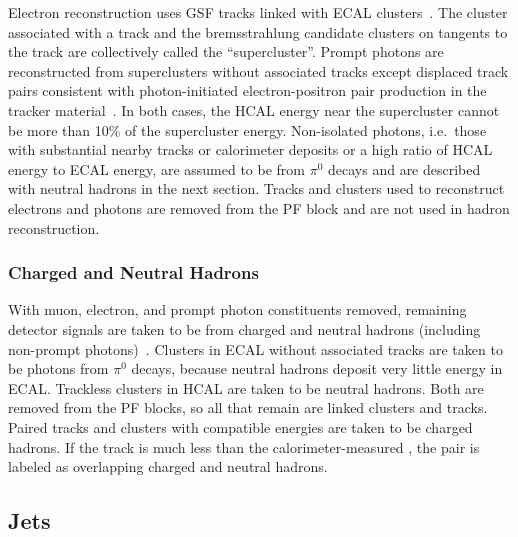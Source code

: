 Electron reconstruction uses GSF tracks linked with ECAL clusters~\cite{Baffioni:2006cd,Adam:2005bya}.
The cluster associated with a track and the bremsstrahlung candidate clusters on tangents to the track are collectively called the ``supercluster''.
Prompt photons are reconstructed from superclusters without associated tracks except displaced track pairs consistent with photon-initiated electron-positron pair production in the tracker material~\cite{Khachatryan:2015iwa}.
In both cases, the HCAL energy near the supercluster cannot be more than 10\% of the supercluster energy.
Non-isolated photons, i.e.\ those with substantial nearby tracks or calorimeter deposits or a high ratio of HCAL energy to ECAL energy, are assumed to be from $\pi^0$ decays and are described with neutral hadrons in the next section.
Tracks and clusters used to reconstruct electrons and photons are removed from the PF block and are not used in hadron reconstruction.


\subsubsection{Charged and Neutral Hadrons}

With muon, electron, and prompt photon constituents removed, remaining detector signals are taken to be from charged and neutral hadrons (including non-prompt photons)~\cite{CMS:2009nxa,Sirunyan:2017ulk}.
Clusters in ECAL without associated tracks are taken to be photons from $\pi^0$ decays, because neutral hadrons deposit very little energy in ECAL\@.
Trackless clusters in HCAL are taken to be neutral hadrons.
Both are removed from the PF blocks, so all that remain are linked clusters and tracks.
Paired tracks and clusters with compatible energies are taken to be charged hadrons.
If the track {\pt} is much less than the calorimeter-measured {\pt}, the pair is labeled as overlapping charged and neutral hadrons.


\subsection{Jets}

